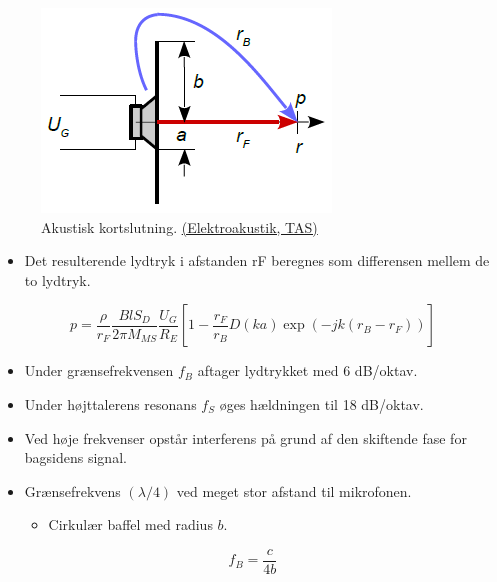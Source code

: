\begin{figure} [H]
	\centering
	\includegraphics[width=0.5\linewidth]{graphics/53.png}
	\caption{Akustisk kortslutning. \href{http://www.torean.dk/artikel/Elektroakustik.pdf}{(Elektroakustik, TAS)}}
	\label{fig:53}
\end{figure}

\begin{itemize}
	\item Det resulterende lydtryk i afstanden rF beregnes som differensen mellem de to lydtryk.
\end{itemize}

\begin{equation}
p = \dfrac{\rho}{r_F}\dfrac{Bl S_D}{2\pi M_{MS}}\dfrac{U_G}{R_E}\left[1-\dfrac{r_F}{r_B}D(ka)\exp(-jk(r_B-r_F))\right]
\end{equation}


\begin{itemize}
	\item Under	grænsefrekvensen $f_B$ aftager lydtrykket med 6 dB/oktav.
	\item Under højttalerens resonans $f_S$ øges hældningen til 18 dB/oktav. \item Ved høje frekvenser opstår interferens på grund af den skiftende
	fase for bagsidens signal.
	\item Grænsefrekvens $(\lambda/4)$ ved meget stor afstand til mikrofonen.
	\begin{itemize}
		\item Cirkulær baffel med radius $b$.
	\end{itemize}
\end{itemize}

\begin{equation}
f_B=\dfrac{c}{4b}
\end{equation}

